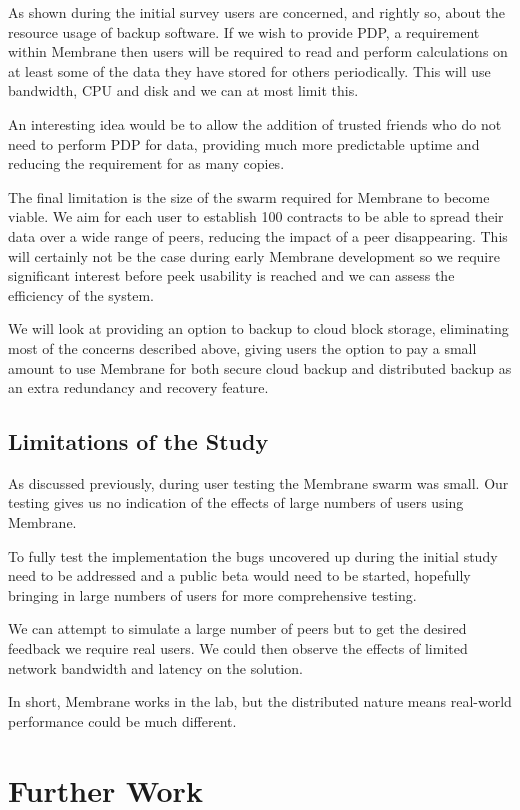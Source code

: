 \documentclass[11pt, a4paper, twoside]{report}
\begin{document}
As shown during the initial survey users are concerned, and rightly so, about the resource usage of backup software. If we wish to provide PDP, a requirement within Membrane then users will be required to read and perform calculations on at least some of the data they have stored for others periodically. This will use bandwidth, CPU and disk and we can at most limit this.

An interesting idea would be to allow the addition of trusted friends who do not need to perform PDP for data, providing much more predictable uptime and reducing the requirement for as many copies.

The final limitation is the size of the swarm required for Membrane to become viable. We aim for each user to establish 100 contracts to be able to spread their data over a wide range of peers, reducing the impact of a peer disappearing. This will certainly not be the case during early Membrane development so we require significant interest before peek usability is reached and we can assess the efficiency of the system.

We will look at providing an option to backup to cloud block storage, eliminating most of the concerns described above, giving users the option to pay a small amount to use Membrane for both secure cloud backup and distributed backup as an extra redundancy and recovery feature.

\subsection{Limitations of the Study}

As discussed previously, during user testing the Membrane swarm was small. Our testing gives us no indication of the effects of large numbers of users using Membrane.

To fully test the implementation the bugs uncovered up during the initial study need to be addressed and a public beta would need to be started, hopefully bringing in large numbers of users for more comprehensive testing.

We can attempt to simulate a large number of peers but to get the desired feedback we require real users. We could then observe the effects of limited network bandwidth and latency on the solution.

In short, Membrane works in the lab, but the distributed nature means real-world performance could be much different.

\section{Further Work}
\end{document}
